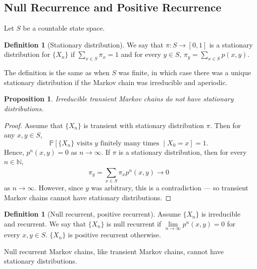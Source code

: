 \documentclass{tufte-handout}
\newcommand*\N{\mathbb{N}}
\renewcommand*\P{\mathbb{P}}
\newtheorem{prop}[thm]{Proposition}
\theoremstyle{definition}
\newtheorem{defn}[thm]{Definition}
\begin{document}
\subsection{Null Recurrence and Positive Recurrence}

Let $S$ be a countable state space. 

\begin{defn}[Stationary distribution]
	We say that $\pi: S \to [0,1]$ is a stationary distribution for $\{X_n\}$ if $\sum\limits_{x \in S}^{} \pi_x = 1$ and for every $y \in S$, $\pi_y = \sum\limits_{x \in S}^{} p(x,y)$.
\end{defn}

The definition is the same as when $S$ was finite, in which case there was a unique stationary distribution if the Markov chain was irreducible and aperiodic. 

\begin{prop}
	Irreducible transient Markov chains do not have stationary distributions.
\end{prop}
\begin{proof}
	Assume that $\{X_n\}$ is transient with stationary distribution $\pi$. Then for any $x,y \in S$, \begin{equation*}\P\left[\{X_n\} \text{ visits $y$ finitely many times } \mid X_0 = x\right]  = 1.\end{equation*} Hence, $p^n(x,y) = 0$ as $n \to \infty$. If $\pi$ is a stationary distribution, then for every $n \in \N$, \[
	\pi_y = \sum\limits_{x \in S}^{} \pi_x p^n(x,y) \to 0
\] as $n \to \infty$. However, since $y$ was arbitrary, this is a contradiction --- so transient Markov chains cannot have stationary distributions.
\end{proof}

\begin{defn}[Null recurrent, positive recurrent]
	Assume $\{X_n\}$ is irreducible and recurrent. We say that $\{X_n\}$ is null recurrent if $\lim\limits_{n \to \infty} p^n(x,y) = 0$ for every $x,y \in S$. $\{X_n\}$ is positive recurrent otherwise.

	Null recurrent Markov chains, like transient Markov chains, cannot have stationary distributions.
\end{defn}
\end{document}
